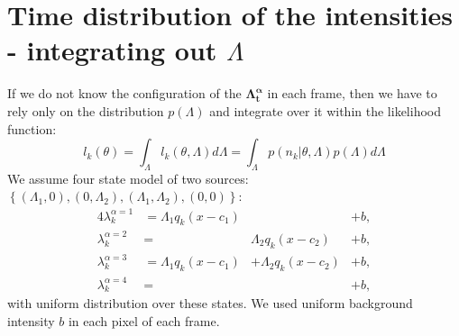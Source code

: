 
\section{Time distribution of the intensities - integrating out $\Lambda$}
\label{sub:Appendix Time-distribution-Integrating out}
If we do not know the configuration of the $\bm{\Lambda^\alpha_t}$ in each frame, then we have to rely only on the distribution $p(\Lambda)$ and integrate over it within the likelihood function:
%
\begin{equation}
	l_k(\theta)=\int_{\Lambda}l_k(\theta,\Lambda)d\Lambda=\int_{\Lambda}p(n_k|\theta,\Lambda)p(\Lambda)d\Lambda
	\label{eq:app-log lik - int out}
\end{equation}
%
We assume four state model of two sources: $\left\{ (\Lambda_1,0),(0,\Lambda_2),(\Lambda_1,\Lambda_2),(0,0)\right\}$: 
%
\begin{alignat}{4}
	\lambda_k^{\alpha=1}&=\Lambda_1q_k(x-c_1) & &+b,\nonumber\\ 
	\lambda_k^{\alpha=2}&=&\Lambda_2q_k(x-c_2) &+b,\nonumber\\ 
	\lambda_k^{\alpha=3}&=\Lambda_1q_k(x-c_1)&+\Lambda_2q_k(x-c_2)&+b,\nonumber\\ 
	\lambda_k^{\alpha=4}&=& &+b,
\end{alignat}
%
with uniform distribution over these states. We used uniform background intensity $b$ in each pixel of each frame. 

